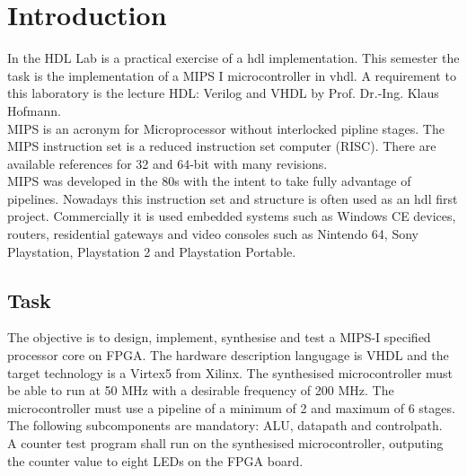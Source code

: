\chapter{Introduction}
In the HDL Lab is a practical exercise of a hdl implementation. This semester the task is the implementation of a MIPS I microcontroller in vhdl. 
A requirement to this laboratory is the lecture HDL: Verilog and VHDL by Prof. Dr.-Ing. Klaus Hofmann.\\
MIPS is an acronym for Microprocessor without interlocked pipline stages.
The MIPS instruction set is a reduced instruction set computer (RISC). There are available references for 32 and 64-bit with many revisions.\\
MIPS was developed in the 80s with the intent to take fully advantage of pipelines. Nowadays this instruction set and structure 
is often used as an hdl first project. Commercially it is used embedded systems such as Windows CE devices, routers, residential gateways and video
consoles such as Nintendo 64, Sony Playstation, Playstation 2 and Playstation Portable. \\

\section{Task}

The objective is to design, implement, synthesise and test a MIPS-I specified processor core on FPGA. 
The hardware description langugage is VHDL and the target technology is a Virtex5 from Xilinx.
The synthesised microcontroller must be able to run at 50 MHz with a desirable frequency of 200 MHz. 
The microcontroller must use a pipeline of a minimum of 2 and maximum of 6 stages.
The following subcomponents are mandatory: ALU, datapath and controlpath.\\
A counter test program shall run on the synthesised microcontroller, outputing the counter value
to eight LEDs on the FPGA board.
